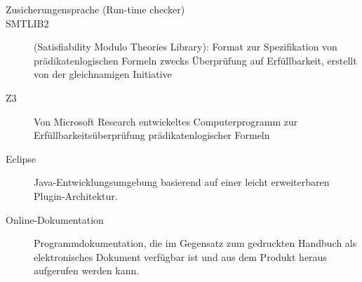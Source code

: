 \begin{description}
    \item[Zusicherungensprache (Run-time checker)]
    \item[SMTLIB2] (Satisfiability Modulo Theories Library): Format zur Spezifikation von prädikatenlogischen Formeln zwecks Überprüfung auf Erfüllbarkeit, erstellt von der gleichnamigen Initiative
    \item[Z3] Von Microsoft Research entwickeltes Computerprogramm zur Erfüllbarkeitsüberprüfung prädikatenlogischer Formeln
    \item[Eclipse] Java-Entwicklungsumgebung basierend auf einer leicht erweiterbaren Plugin-Architektur.
    \item[Online-Dokumentation] Programmdokumentation, die im Gegensatz zum gedruckten Handbuch als elektronisches Dokument verfügbar ist und aus dem Produkt heraus aufgerufen werden kann.
\end{description}


